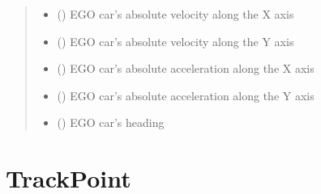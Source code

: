 \documentclass[letterpaper,10pt,english]{sphinxmanual}
\begin{document}
\begin{fulllineitems}
\begin{quote}
\begin{description}
\begin{itemize}
\item {} 
 () \textendash{} EGO car’s absolute velocity along the X axis

\item {} 
 () \textendash{} EGO car’s absolute velocity along the Y axis

\item {} 
 () \textendash{} EGO car’s absolute acceleration along the X axis

\item {} 
 () \textendash{} EGO car’s absolute acceleration along the Y axis

\item {} 
 () \textendash{} EGO car’s heading

\end{itemize}

\end{description}\end{quote}

\end{fulllineitems}



\section{TrackPoint}
\label{\detokenize{datacontainers:trackpoint}}
\end{document}
